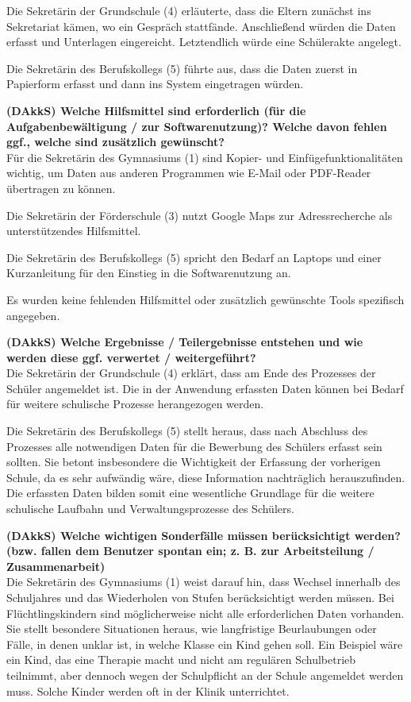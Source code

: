 Die Sekretärin der Grundschule (4) erläuterte, dass die Eltern zunächst ins Sekretariat kämen, wo ein Gespräch stattfände. Anschließend würden die Daten erfasst und Unterlagen eingereicht. Letztendlich würde eine Schülerakte angelegt.

Die Sekretärin des Berufskollegs (5) führte aus, dass die Daten zuerst in Papierform erfasst und dann ins System eingetragen würden.


\textbf{(DAkkS) Welche Hilfsmittel sind erforderlich (für die Aufgabenbewältigung / zur Softwarenutzung)? Welche davon fehlen ggf., welche sind zusätzlich gewünscht?}\\
Für die Sekretärin des Gymnasiums (1) sind Kopier- und Einfügefunktionalitäten wichtig, um Daten aus anderen Programmen wie E-Mail oder PDF-Reader übertragen zu können.

Die Sekretärin der Förderschule (3) nutzt Google Maps zur Adressrecherche als unterstützendes Hilfsmittel.

Die Sekretärin des Berufskollegs (5) spricht den Bedarf an Laptops und einer Kurzanleitung für den Einstieg in die Softwarenutzung an.

Es wurden keine fehlenden Hilfsmittel oder zusätzlich gewünschte Tools spezifisch angegeben.

\textbf{(DAkkS) Welche Ergebnisse / Teilergebnisse entstehen und wie werden diese ggf. verwertet / weitergeführt?}\\
Die Sekretärin der Grundschule (4) erklärt, dass am Ende des Prozesses der Schüler angemeldet ist. Die in der Anwendung erfassten Daten können bei Bedarf für weitere schulische Prozesse herangezogen werden.

Die Sekretärin des Berufskollegs (5) stellt heraus, dass nach Abschluss des Prozesses alle notwendigen Daten für die Bewerbung des Schülers erfasst sein sollten. Sie betont insbesondere die Wichtigkeit der Erfassung der vorherigen Schule, da es sehr aufwändig wäre, diese Information nachträglich herauszufinden. Die erfassten Daten bilden somit eine wesentliche Grundlage für die weitere schulische Laufbahn und Verwaltungsprozesse des Schülers.

\textbf{(DAkkS) Welche wichtigen Sonderfälle müssen berücksichtigt werden? (bzw. fallen dem Benutzer spontan ein; z. B. zur Arbeitsteilung / Zusammenarbeit)}\\
Die Sekretärin des Gymnasiums (1) weist darauf hin, dass Wechsel innerhalb des Schuljahres und das Wiederholen von Stufen berücksichtigt werden müssen. Bei Flüchtlingskindern sind möglicherweise nicht alle erforderlichen Daten vorhanden. Sie stellt besondere Situationen heraus, wie langfristige Beurlaubungen oder Fälle, in denen unklar ist, in welche Klasse ein Kind gehen soll. Ein Beispiel wäre ein Kind, das eine Therapie macht und nicht am regulären Schulbetrieb teilnimmt, aber dennoch wegen der Schulpflicht an der Schule angemeldet werden muss. Solche Kinder werden oft in der Klinik unterrichtet.

